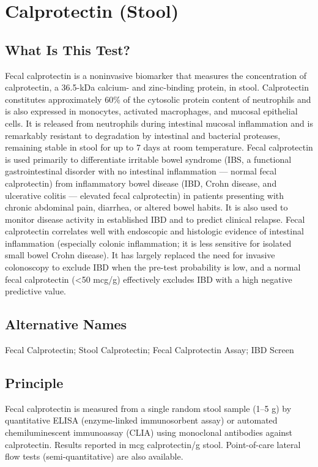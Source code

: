 \chapter{Calprotectin (Stool)}
\section*{What Is This Test?}
Fecal calprotectin is a noninvasive biomarker that measures the concentration of calprotectin, a 36.5-kDa calcium- and zinc-binding protein, in stool. Calprotectin constitutes approximately 60\% of the cytosolic protein content of neutrophils and is also expressed in monocytes, activated macrophages, and mucosal epithelial cells. It is released from neutrophils during intestinal mucosal inflammation and is remarkably resistant to degradation by intestinal and bacterial proteases, remaining stable in stool for up to 7 days at room temperature. Fecal calprotectin is used primarily to differentiate irritable bowel syndrome (IBS, a functional gastrointestinal disorder with no intestinal inflammation --- normal fecal calprotectin) from inflammatory bowel disease (IBD, Crohn disease, and ulcerative colitis --- elevated fecal calprotectin) in patients presenting with chronic abdominal pain, diarrhea, or altered bowel habits. It is also used to monitor disease activity in established IBD and to predict clinical relapse. Fecal calprotectin correlates well with endoscopic and histologic evidence of intestinal inflammation (especially colonic inflammation; it is less sensitive for isolated small bowel Crohn disease). It has largely replaced the need for invasive colonoscopy to exclude IBD when the pre-test probability is low, and a normal fecal calprotectin (<50 mcg/g) effectively excludes IBD with a high negative predictive value.
\section*{Alternative Names}
Fecal Calprotectin; Stool Calprotectin; Fecal Calprotectin Assay; IBD Screen
\section*{Principle}
Fecal calprotectin is measured from a single random stool sample (1--5 g) by quantitative ELISA (enzyme-linked immunosorbent assay) or automated chemiluminescent immunoassay (CLIA) using monoclonal antibodies against calprotectin. Results reported in mcg calprotectin/g stool. Point-of-care lateral flow tests (semi-quantitative) are also available.
